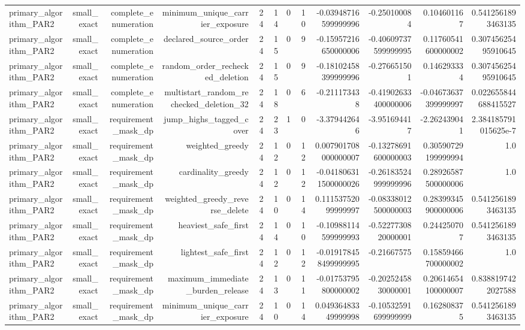 {\begin{longtable}{lrrrrrrrrrrr}
primary\_algorithm\_PAR2 & small\_exact & complete\_enumeration & minimum\_unique\_carrier\_exposure & 24 & 14 & 0 & 10 & -0.03948716599999996 & -0.250100084 & 0.104601167 & 0.5412561893463135 \\
primary\_algorithm\_PAR2 & small\_exact & complete\_enumeration & declared\_source\_order & 24 & 15 & 0 & 9 & -0.15957216650000006 & -0.40609737599999995 & 0.11760541600000002 & 0.30745625495910645 \\
primary\_algorithm\_PAR2 & small\_exact & complete\_enumeration & random\_order\_rechecked\_deletion & 24 & 15 & 0 & 9 & -0.18102458399999996 & -0.276651501 & 0.146293334 & 0.30745625495910645 \\
primary\_algorithm\_PAR2 & small\_exact & complete\_enumeration & multistart\_random\_rechecked\_deletion\_32 & 24 & 18 & 0 & 6 & -0.211173438 & -0.41902633400000006 & -0.04673637399999997 & 0.022655844688415527 \\
primary\_algorithm\_PAR2 & small\_exact & requirement\_mask\_dp & jump\_highs\_tagged\_cover & 24 & 23 & 1 & 0 & -3.379442646 & -3.951694417 & -2.262439041 & 2.384185791015625e-7 \\
primary\_algorithm\_PAR2 & small\_exact & requirement\_mask\_dp & weighted\_greedy & 24 & 12 & 0 & 12 & 0.007901708000000007 & -0.13278691600000003 & 0.30590729199999994 & 1.0 \\
primary\_algorithm\_PAR2 & small\_exact & requirement\_mask\_dp & cardinality\_greedy & 24 & 12 & 0 & 12 & -0.041806311500000026 & -0.26183524999999996 & 0.28926587500000006 & 1.0 \\
primary\_algorithm\_PAR2 & small\_exact & requirement\_mask\_dp & weighted\_greedy\_reverse\_delete & 24 & 10 & 0 & 14 & 0.11153752099999997 & -0.08338012500000003 & 0.28399345900000006 & 0.5412561893463135 \\
primary\_algorithm\_PAR2 & small\_exact & requirement\_mask\_dp & heaviest\_safe\_first & 24 & 14 & 0 & 10 & -0.10988114599999993 & -0.5227730820000001 & 0.244250707 & 0.5412561893463135 \\
primary\_algorithm\_PAR2 & small\_exact & requirement\_mask\_dp & lightest\_safe\_first & 24 & 12 & 0 & 12 & -0.019178458499999995 & -0.21667575 & 0.15859466700000002 & 1.0 \\
primary\_algorithm\_PAR2 & small\_exact & requirement\_mask\_dp & maximum\_immediate\_burden\_release & 24 & 13 & 0 & 11 & -0.01753795800000002 & -0.2025245830000001 & 0.20614654100000007 & 0.8388197422027588 \\
primary\_algorithm\_PAR2 & small\_exact & requirement\_mask\_dp & minimum\_unique\_carrier\_exposure & 24 & 10 & 0 & 14 & 0.04936483349999998 & -0.10532591699999999 & 0.162808375 & 0.5412561893463135 \\

\end{longtable}}
